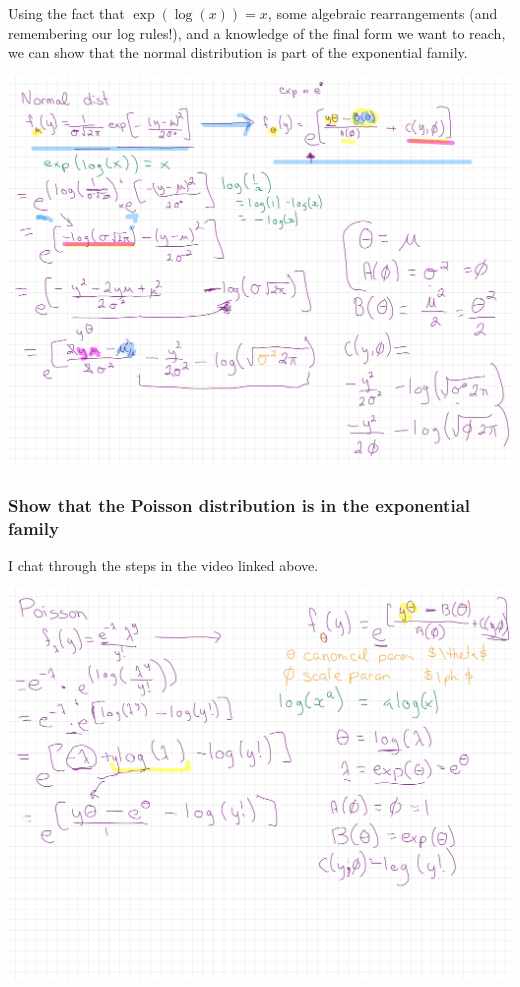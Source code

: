 \documentclass[
  openany]{book}
\begin{document}
Using the fact that \(\exp(\log(x)) = x\), some algebraic rearrangements (and remembering our log rules!), and a knowledge of the final form we want to reach, we can show that the normal distribution is part of the exponential family.

\begin{center}\includegraphics[width=1\linewidth]{images/m4/normal} \end{center}

\hypertarget{show-that-the-poisson-distribution-is-in-the-exponential-family}{%
\subsubsection{Show that the Poisson distribution is in the exponential family}\label{show-that-the-poisson-distribution-is-in-the-exponential-family}}

I chat through the steps in the video linked above.

\begin{center}\includegraphics[width=1\linewidth]{images/m4/Poisson} \end{center}
\end{document}

